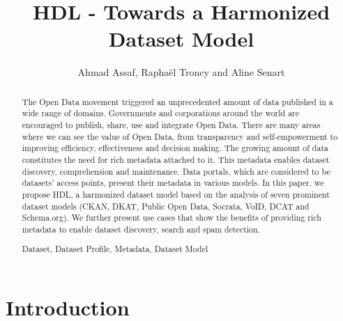 \documentclass[runningheads,a4paper]{llncs}
\newcommand{\keywords}[1]{\par\addvspace\baselineskip
\noindent\keywordname\enspace\ignorespaces#1}
\begin{document}
\title{HDL - Towards a Harmonized Dataset Model}

\author{Ahmad Assaf, Rapha\"{e}l Troncy and Aline Senart}



\maketitle


\begin{abstract}

The Open Data movement triggered an unprecedented amount of data published in a wide range of domains. Governments and corporations around the world are encouraged to publish, share, use and integrate Open Data. There are many areas where we can see the value of Open Data, from transparency and self-empowerment to improving efficiency, effectiveness and decision making. The growing amount of data constitutes the need for rich metadata attached to it. This metadata enables dataset discovery, comprehension and maintenance. Data portals, which are considered to be datasets' access points, present their metadata in various models. In this paper, we propose HDL, a harmonized dataset model based on the analysis of seven prominent dataset models (CKAN, DKAT, Public Open Data, Socrata, VoID, DCAT and Schema.org). We further present use cases that show the benefits of providing rich metadata to enable dataset discovery, search and spam detection.

\keywords{Dataset, Dataset Profile, Metadata, Dataset Model}
\end{abstract}


\section{Introduction}
\label{sec:introduction}
\end{document}
